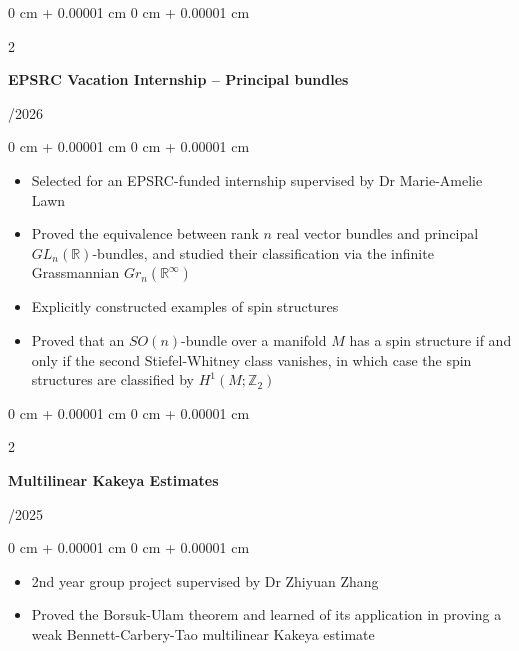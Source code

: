 \documentclass[10pt, letterpaper]{article}
\newenvironment{highlights}{
    \begin{itemize}[
        topsep=0.10 cm,
        parsep=0.10 cm,
        partopsep=0pt,
        itemsep=0pt,
        leftmargin=0 cm + 10pt
    ]
}{
    \end{itemize}
}
\newenvironment{onecolentry}{
    \begin{adjustwidth}{
        0 cm + 0.00001 cm
    }{
        0 cm + 0.00001 cm
    }
}{
    \end{adjustwidth}
}
\newenvironment{twocolentry}[2][]{
    \onecolentry
    \def\secondColumn{#2}
    \setcolumnwidth{\fill, 4.5 cm}
    \begin{paracol}{2}
}{
    \switchcolumn \raggedleft \secondColumn
    \end{paracol}
    \endonecolentry
} %
\begin{document}
        \vspace{0.2 cm}


        \begin{twocolentry}{
            09/2026
        }
            \textbf{EPSRC Vacation Internship -- Principal bundles}
        \end{twocolentry}

        \vspace{0.10 cm}
        \begin{onecolentry}
            \begin{highlights}
                \item Selected for an EPSRC-funded internship supervised by Dr Marie-Amelie Lawn
                \item Proved the equivalence between rank \(n\) real vector bundles and principal \(GL_n(\mathbb{R})\)-bundles, and studied their classification via the infinite Grassmannian \(Gr_n(\mathbb{R}^\infty)\)
                \item Explicitly constructed examples of spin structures
                \item Proved that an \(SO(n)\)-bundle over a manifold \(M\) has a spin structure if and only if the second Stiefel-Whitney class vanishes, in which case the spin structures are classified by \(H^1(M; \mathbb{Z}_2)\)
            \end{highlights}
        \end{onecolentry}

        \vspace{0.2 cm}

        \begin{twocolentry}{
            06/2025
        }
            \textbf{Multilinear Kakeya Estimates}
        \end{twocolentry}

        \vspace{0.10 cm}
        \begin{onecolentry}
            \begin{highlights}
                \item 2nd year group project supervised by Dr Zhiyuan Zhang
                \item Proved the Borsuk-Ulam theorem and learned of its application in proving a weak Bennett-Carbery-Tao multilinear Kakeya estimate
            \end{highlights}
        \end{onecolentry}


        \vspace{0.2 cm}
\end{document}
